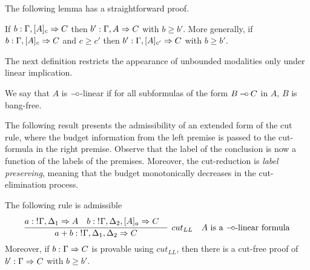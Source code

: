 The following lemma has a straightforward proof.
\begin{lemma}
If $b:\Gamma, [A]_c \Rightarrow C$ then 
$b': \Gamma, A \Rightarrow C$
with $b \geq b'$. More generally,  if $b:\Gamma, [A]_c \Rightarrow C$ and $c \geq c'$ then
$b':\Gamma, [A]_{c'} \Rightarrow C$ with $b \geq b'$. 
\end{lemma}
The next definition restricts the appearance of unbounded modalities 
only under linear implication.
\begin{definition}
We say that $A$ is  $\mathbin{-\hspace{-0.70mm}\circ}$-linear if for all subformulas of the form $B \mathbin{-\hspace{-0.70mm}\circ} C$ in $A$, $B$ is bang-free.
\end{definition}
The following result presents the admissibility of an extended form of the cut rule, where the budget information from the left premise is passed to the cut-formula in the right premise. Observe that the label
of the conclusion is now a function of the labels of the premises. Moreover, the cut-reduction is {\em label preserving}, meaning that the budget monotonically decreases in the cut-elimination process.
\begin{theorem}
The following rule is admissible
$$
\infer[cut_{LL}\mbox{\quad $A$ is a $\limp$-linear formula}]{a+b: \nbang{}\Gamma,\Delta_1,\Delta_2 \seq C}{
 \deduce{a:\nbang{}\Gamma,\Delta_1 \seq A}{}&
 \deduce{b:\nbang{}\Gamma,\Delta_2, [A]_a \seq C}{}&
}
$$
Moreover, if $b: \Gamma \Rightarrow C$ is provable using $cut_{LL}$, then there is a cut-free proof of 
$b': \Gamma \Rightarrow C$ with $b\geq b'$.

\end{theorem}
